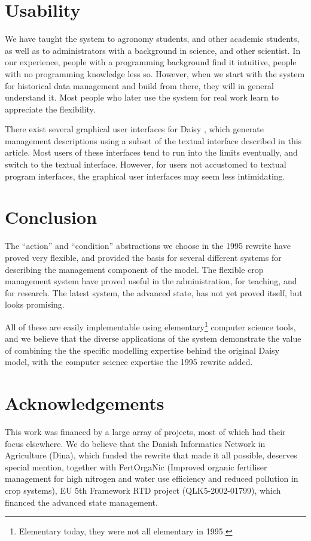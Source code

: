 \documentclass[a4paper]{article}
\begin{document}
\section{Usability}

We have taught the system to agronomy students, and other academic
students, as well as to administrators with a background in science,
and other scientist.  In our experience, people with a programming
background find it intuitive, people with no programming knowledge
less so.  However, when we start with the system for historical data
management and build from there, they will in general understand it.
Most people who later use the system for real work learn to appreciate
the flexibility.

There exist several graphical user interfaces for Daisy
\cite{plantinfo-daisy,daisygis,fertorganic}, which generate management
descriptions using a subset of the textual interface described in this
article.  Most users of these interfaces tend to run into the limits
eventually, and switch to the textual interface.  However, for users
not accustomed to textual program interfaces, the graphical user
interfaces may seem less intimidating.

\section{Conclusion}

The ``action'' and ``condition'' abstractions we choose in the 1995
rewrite have proved very flexible, and provided the basis for several
different systems for describing the management component of the
model.  The flexible crop management system have proved useful in the
administration, for teaching, and for research.  The latest system, the
advanced state, has not yet proved itself, but looks promising.  

All of these are easily implementable using
elementary\footnote{Elementary today, they were not all elementary in
  1995.}  computer science tools, and we believe that the diverse
applications of the system demonstrate the value of combining the the
specific modelling expertise behind the original Daisy model, with the
computer science expertise the 1995 rewrite added.

\section{Acknowledgements}

This work was financed by a large array of projects, most of which had
their focus elsewhere.  We do believe that the Danish Informatics
Network in Agriculture (Dina), which funded the rewrite that made it
all possible, deserves special mention, together with FertOrgaNic
(Improved organic fertiliser management for high nitrogen and water
use efficiency and reduced pollution in crop systems), EU 5th
Framework RTD project (QLK5-2002-01799), which financed the advanced
state management.


\end{document}
